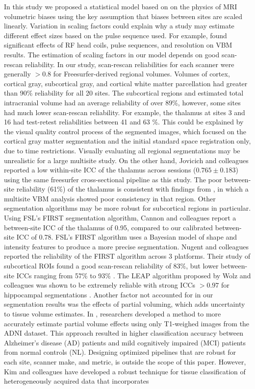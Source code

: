 In this study we proposed a statistical model based on on the physics of MRI volumetric biases using the key assumption that biases between sites are scaled linearly. Variation in scaling factors could explain why a study may estimate different effect sizes based on the pulse sequence used. For example, \cite{streitburger2014impact} found significant effects of RF head coils, pulse sequences, and resolution on VBM results. The estimation of scaling factors in our model depends on good scan-rescan reliability. In our study, scan-rescan reliabilities for each scanner were generally $>0.8$ for Freesurfer-derived regional volumes. Volumes of cortex, cortical gray, subcortical gray, and cortical white matter parcellation had greater than 90\% reliability for all 20 sites. The subcortical regions and estimated total intracranial volume had an average reliability of over 89\%, however, some sites had much lower scan-rescan reliability. For example, the thalamus at sites 3 and 16 had test-retest reliabilities between 41 and 63 \%. This could be explained by the visual quality control process of the segmented images, which focused on the cortical gray matter segmentation and the initial standard space registration only, due to time restrictions. Visually evaluating all regional segmentations may be unrealistic for a large multisite study. On the other hand, Jovicich and colleagues \cite{jovicich2013brain} reported a low within-site ICC of the thalamus across sessions ($0.765 \pm 0.183$) using the same freesurfer cross-sectional pipeline as this study. The poor between-site reliability (61\%) of the thalamus is consistent with findings from \cite{schnack2010mapping}, in which a multisite VBM analysis showed poor consistency in that region. Other segmentation algorithms may be more robust for subcortical regions in particular. Using FSL's FIRST segmentation algorithm, Cannon and colleagues \cite{cannon2014} report a between-site ICC of the thalamus of 0.95, compared to our calibrated between-site ICC of 0.78. FSL's FIRST algorithm \cite{firstcitation} uses a Bayesian model of shape and intensity features to produce a more precise segmentation. Nugent and colleagues reported the reliability of the FIRST algorithm across 3 platforms. Their study of subcortical ROIs found a good scan-rescan reliability of 83\%, but lower between-site ICCs ranging from 57\% to 93\% \cite{firstreliability}. The LEAP algorithm proposed by Wolz and colleagues \cite{Wolz_2010} was shown to be extremely reliable with strong ICCs $>0.97$ for hippocampal segmentations \cite{Wolz_2014}. Another factor not accounted for in our segmentation results was the effects of partial voluming, which adds uncertainty to tissue volume estimates. In \cite{Roche_2014}, researchers developed a method to more accurately estimate partial volume effects using only T1-weighed images from the ADNI dataset. This approach resulted in higher classification accuracy between Alzheimer's disease (AD) patients and mild cognitively impaired (MCI) patients from normal controls (NL). Designing optimized pipelines that are robust for each site, scanner make, and metric, is outside the scope of this paper. However, Kim and colleagues have developed a robust technique for tissue classification of heterogeneously acquired data that incorporates 